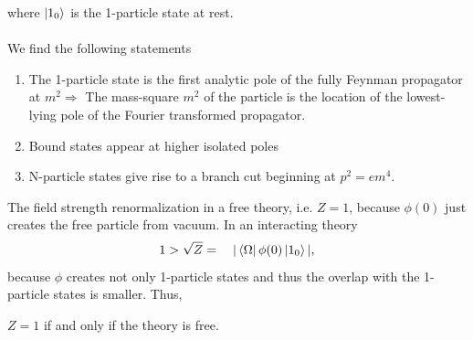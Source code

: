 where $\ket{1_0}$ is the 1-particle state at rest.
\\
\\
We find the following statements 
\begin{enumerate}
	\item
	  The 1-particle state is the first analytic pole of the fully Feynman propagator at $m^2 \Rightarrow$ The mass-square $m^2$ of the particle is the location of the lowest-lying pole of the Fourier transformed propagator.
	\item Bound states appear at higher isolated poles
	\item N-particle states give rise to a branch cut beginning at $p^2=em^4$.
\end{enumerate}
The field strength renormalization in a free theory, i.e. $Z=1$, because $\phi(0)$ just creates the free particle from vacuum. In an interacting theory
\begin{equation}
	1 > \sqrt{Z} = \quad |\bra{\Omega} \phi(0) \ket{1_0}|,
\end{equation}
because $\phi$ creates not only 1-particle states and thus the overlap with the 1-particle states is smaller. Thus,
\begin{statements}
	$Z=1$ if and only if the theory is free.
\end{statements}

